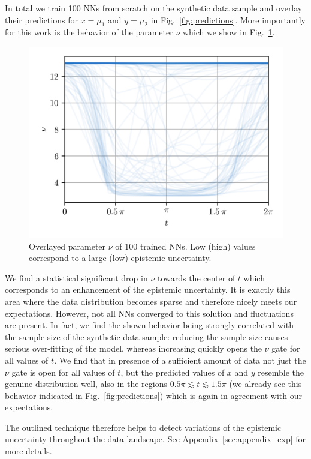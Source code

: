 \documentclass{article}
\begin{document}
In total we train 100 NNs from scratch on the synthetic data sample and overlay their predictions for $x = \mu_1$ and $y = \mu_2$ in Fig.~\ref{fig:predictions}.
More importantly for this work is the behavior of the parameter $\nu$ which we show in Fig.~\ref{fig:nu}.
\begin{figure}[htbp]
    \centering
    \includegraphics[scale=.8]{nu.png}
    \caption{Overlayed parameter $\nu$ of 100 trained NNs. Low (high) values correspond to a large (low) epistemic uncertainty.}
    \label{fig:nu}
\end{figure}
We find a statistical significant drop in $\nu$ towards the center of $t$ which corresponds to an enhancement of the epistemic uncertainty.
It is exactly this area where the data distribution becomes sparse and therefore nicely meets our expectations.
However, not all NNs converged to this solution and fluctuations are present.
In fact, we find the shown behavior being strongly correlated with the sample size of the synthetic data sample: reducing the sample size causes serious over-fitting of the model, whereas increasing quickly opens the $\nu$ gate for all values of $t$.
We find that in presence of a sufficient amount of data not just the $\nu$ gate is open for all values of $t$, but the predicted values of $x$ and $y$ resemble the genuine distribution well, also in the regions $0.5\pi \lesssim t \lesssim 1.5\pi$ (we already see this behavior indicated in Fig.~\ref{fig:predictions}) which is again in agreement with our expectations.

The outlined technique therefore helps to detect variations of the epistemic uncertainty throughout the data landscape.
See Appendix~\ref{sec:appendix_exp} for more details.
\end{document}

